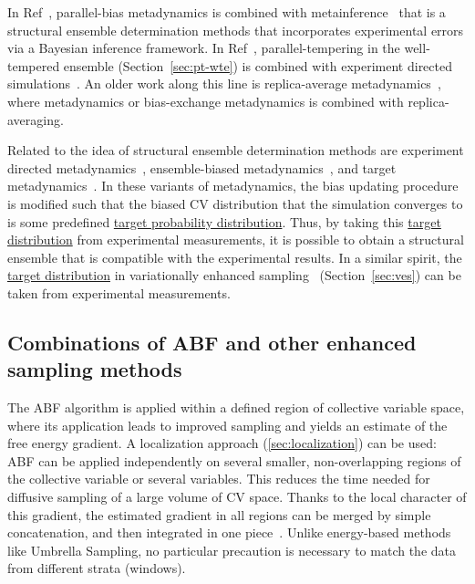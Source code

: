 \documentclass[9pt,review]{livecoms}
\begin{document}
In Ref~\cite{Bonomi_MetadynamicMetainference_SciRep2016}, parallel-bias metadynamics is combined with metainference~\cite{Bonomi_Metainference_SciAdv2016} that is a structural ensemble determination methods that incorporates experimental errors via a Bayesian inference framework. In Ref~\cite{Amirkulova_PTWTE-EDS_JPCB2020}, parallel-tempering in the well-tempered ensemble (Section~\ref{sec:pt-wte}) is combined with experiment directed simulations~\cite{White_EDS_JCTC2014}.
An older work along this line is replica-average metadynamics~\cite{Camilloni_RAM_2013,Camilloni_RAM-2_JACS20214}, where metadynamics or bias-exchange metadynamics is combined with replica-averaging.

Related to the idea of structural ensemble determination methods are experiment directed metadynamics~\cite{White_EDM_2015}, ensemble-biased metadynamics~\cite{Marinelli_EnsembleBiased_2015}, and target metadynamics~\cite{GilLey_TargetMetaD_2016}. In these variants of metadynamics, the bias updating procedure is modified such that the biased CV distribution that the simulation converges to is some predefined \hyperlink{ref:targetdist}{target probability distribution}. Thus, by taking this \hyperlink{ref:targetdist}{target distribution} from experimental measurements, it is possible to obtain a structural ensemble that is compatible with the experimental results. In a similar spirit, the \hyperlink{ref:targetdist}{target distribution} in variationally enhanced sampling~\cite{Valsson_VES_PRL_2014,Valsson2020Handbook_VES} (Section~\ref{sec:ves}) can be taken from experimental measurements.

\subsection{Combinations of ABF and other enhanced sampling methods}
\label{sec:abf_hybrids}

The ABF algorithm is applied within a defined region of collective variable space, where its application leads to improved sampling and yields an estimate of the free energy gradient. A localization approach (\ref{sec:localization}) can be used: ABF can be applied independently on several smaller, non-overlapping regions of the collective variable\cite{Chipot2005} or several variables\cite{Henin2010a}. This reduces the time needed for diffusive sampling of a large volume of CV space. Thanks to the local character of this gradient, the estimated gradient in all regions can be merged by simple concatenation, and then integrated in one piece~\cite{Henin2021integration}. Unlike energy-based methods like Umbrella Sampling, no particular precaution is necessary to match the data from different strata (windows).
\end{document}

